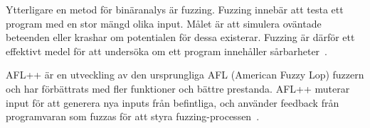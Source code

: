 Ytterligare en metod för binäranalys är fuzzing. Fuzzing innebär att testa ett program med en 
stor mängd olika input. Målet är att simulera oväntade beteenden eller krashar om potentialen för 
dessa existerar. Fuzzing är därför ett effektivt medel för att undersöka om ett program innehåller 
sårbarheter~\cite{rawat}.

AFL++ är en utveckling av den ursprungliga AFL (American Fuzzy Lop) fuzzern och har 
förbättrats med fler funktioner och bättre prestanda. AFL++ muterar input för 
att generera nya inputs från befintliga, och använder feedback från programvaran som fuzzas för att 
styra fuzzing-processen~\cite{aflplusplus}.  


